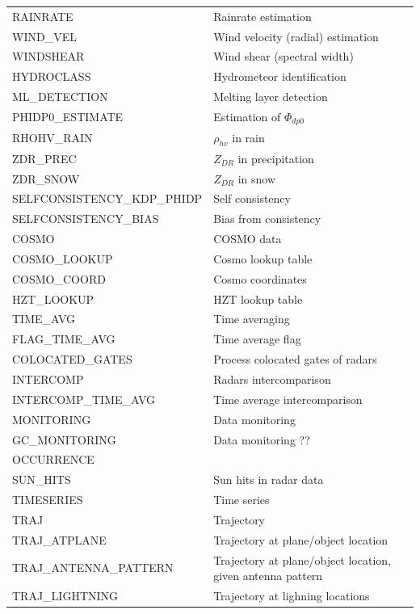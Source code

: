 \documentclass[a4paper,11pt,pdftex,twoside]{scrartcl}
\begin{document}
{{{\begin{longtable}{p{}p{}p{}}
RAINRATE & Rainrate estimation & \\
WIND\_VEL & Wind velocity (radial) estimation & \\
WINDSHEAR & Wind shear (spectral width) & \\
HYDROCLASS & Hydrometeor identification & \\
ML\_DETECTION &  Melting layer detection & \\
PHIDP0\_ESTIMATE &  Estimation of $\Phi_{dp0}$ & \\
RHOHV\_RAIN &  $\rho_{hv}$ in rain & \\
ZDR\_PREC &  $Z_{DR}$ in precipitation& \\
ZDR\_SNOW &  $Z_{DR}$ in  snow & \\
SELFCONSISTENCY\_KDP\_PHIDP & Self consistency & \\
SELFCONSISTENCY\_BIAS & Bias from consistency & \\
COSMO & COSMO data & \\
COSMO\_LOOKUP & Cosmo lookup table & \\
COSMO\_COORD & Cosmo coordinates & \\
HZT\_LOOKUP & HZT lookup table & \\
TIME\_AVG & Time averaging & \\
FLAG\_TIME\_AVG & Time average flag& \\
COLOCATED\_GATES & Process colocated gates of radars & \\
INTERCOMP & Radars intercomparison & \\
INTERCOMP\_TIME\_AVG & Time average intercomparison& \\
MONITORING & Data monitoring & \\
GC\_MONITORING & Data monitoring ?? & \\
OCCURRENCE &  & \\
SUN\_HITS & Sun hits in radar data & \\
TIMESERIES & Time series & \\
TRAJ & Trajectory & \\
TRAJ\_ATPLANE & Trajectory at plane/object location & \\
TRAJ\_ANTENNA\_PATTERN & Trajectory at plane/object location, given antenna pattern & \\
TRAJ\_LIGHTNING & Trajectory at lighning locations & \\

\end{longtable}











}}}
\end{document}
